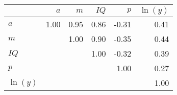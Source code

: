 \begin{tabular}{lrrrrr}
\hline
 & $a$  & $m$  & $IQ$  & $p$  & $\ln(y)$  \\
\hline
$a$ & 1.00  & 0.95  & 0.86  & -0.31  & 0.41  \\
$m$ &   & 1.00  & 0.90  & -0.35  & 0.44  \\
$IQ$ &   &   & 1.00  & -0.32  & 0.39  \\
$p$ &   &   &   & 1.00  & 0.27  \\
$\ln(y)$ &   &   &   &   & 1.00  \\
\hline
\end{tabular}%
